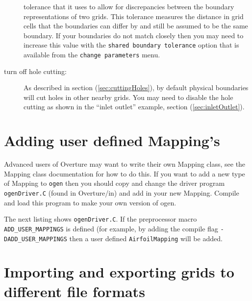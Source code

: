 \documentclass[xcolor=rgb,svgnames,dvipsnames]{article}
\newcommand{\ogen}{\OvertureDir/ogen}
\begin{document}
\begin{description}
     tolerance that it uses to allow for discrepancies between the boundary representations of two grids.
     This tolerance measures the distance in grid cells that the boundaries can differ by and
     still be assumed to be the same boundary. If your boundaries do not match closely then you 
     may need to increase this value with the {\tt shared boundary tolerance} option
     that is available from the {\tt change parameters} menu.
  \item[turn off hole cutting:] As described in section (\ref{sec:cuttingHoles}), by default
    physical boundaries will cut holes in other nearby grids. You may need to disable the hole
    cutting as shown in the ``inlet outlet'' example, section (\ref{sec:inletOutlet}).
\end{description}


\clearpage
\section{Adding user defined Mapping's}


Advanced users of Overture may want to write their own Mapping class, see the Mapping class
documentation for how to do this. 
If you want to
add a new type of Mapping to {\tt ogen} then you should copy and change the  driver program
{\tt ogenDriver.C} (found in Overture/in) and add in your new Mapping. Compile and load this
program to make your own version of ogen.

The next listing shows {\tt ogenDriver.C}. If the preprocessor macro {\tt ADD\_USER\_MAPPINGS}
is defined (for example, by adding the compile flag {\tt -DADD\_USER\_MAPPINGS} 
then a user defined {\tt AirfoilMapping} will be added.

{\footnotesize
\listinginput[1]{1}{\ogen /ogenDriver.C}
}



% 


\section{Importing and exporting grids to different file formats}\label{sec:importExport}
\end{document}
